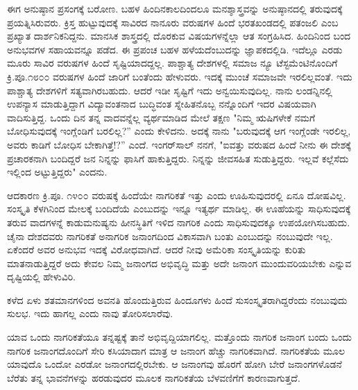 ಈಗ ಅನುಷ್ಠಾನ ಪ್ರಸಂಗಕ್ಕೆ ಬರೋಣ. ಬಹಳ ಹಿಂದಿನಕಾಲದಿಂದಲೂ ಮನಶ್ಶಾಸ್ತ್ರವನ್ನು ಅನುಷ್ಠಾನದಲ್ಲಿ ತರುವುದಕ್ಕೆ ಪ್ರಯತ್ನಿಸಿರುವರು. ಕ್ರಿಸ್ತ ಹುಟ್ಟುವುದಕ್ಕೆ ಸಾವಿರದ ನಾನೂರು ವರುಷಗಳ ಹಿಂದೆ ಭರತಖಂಡದಲ್ಲಿ ಪತಂಜಲಿ ಎಂಬ ಪ್ರಖ್ಯಾತ ದಾರ್ಶನಿಕನಿದ್ದನು. ಮಾನಸಿಕ ಶಾಸ್ತ್ರದಲ್ಲಿ ದೊರಕುವ ವಿಷಯಗಳನ್ನೆಲ್ಲಾ ಆತ ಸಂಗ್ರಹಿಸಿದ. ಹಿಂದಿನಿಂದ ಬಂದ ಅನುಭವಗಳ ಸಹಾಯವನ್ನೂ ಪಡೆದ. ಈ ಪ್ರಪಂಚ ಬಹಳ ಹಳೆಯದೆಂಬುದನ್ನು ಜ್ಞಾಪಕದಲ್ಲಿಡಿ. ಇದೆಲ್ಲೂ ಎರಡು ಮೂರು ಸಾವಿರ ವರುಷಗಳ ಹಿಂದೆ ಸೃಷ್ಟಿಯಾದದ್ದಲ್ಲ. ಪಾಶ್ಚಾತ್ಯ ದೇಶಗಳಲ್ಲಿ ಸಮಾಜ ನ್ಯೂ ಟೆಸ್ಟಮೆಂಟಿನೊಂದಿಗೆ ಕ್ರಿ.ಪೂ.೧೮೦೦ ವರುಷಗಳ ಹಿಂದೆ ಜಾರಿಗೆ ಬಂತೆಂದು ಹೇಳುವರು. ಇದಕ್ಕೆ ಮುಂಚೆ ಸಮಾಜವೇ ಇರಲಿಲ್ಲವಂತೆ. ಇದು ಪಾಶ್ಚಾತ್ಯ ದೇಶಗಳಿಗೆ ಸತ್ಯವಾಗಿರಬಹುದು. ಆದರೆ ಇಡೀ ಸೃಷ್ಟಿಗೆ ಇದು ಅನ್ವಯಿಸುವುದಿಲ್ಲ. ನಾನು ಲಂಡನ್ನಿನಲ್ಲಿ ಉಪನ್ಯಾಸ ಮಾಡುತ್ತಿದ್ದಾಗ ವಿದ್ಯಾವಂತನಾದ ಬುದ್ಧಿವಂತ ಸ್ನೇಹಿತನೊಬ್ಬ ನನ್ನೊಂದಿಗೆ ಇದರ ವಿಷಯವಾಗಿ ವಾದಿಸುತ್ತಿದ್ದ. ಒಂದು ದಿನ ತನ್ನ ವಾದವನ್ನೆಲ್ಲ ವ್ಯರ್ಥಮಾಡಿದ ಮೇಲೆ ತಕ್ಷಣ "ನಿಮ್ಮ ಋಷಿಗಳೇಕೆ ನಮಗೆ ಬೋಧಿಸುವುದಕ್ಕೆ ಇಂಗ್ಲೆಂಡಿಗೆ ಬರಲಿಲ್ಲ?” ಎಂದು ಕೇಳಿದನು. ಅದಕ್ಕೆ ನಾನು "ಬರುವುದಕ್ಕೆ ಆಗ ಇಂಗ್ಲೆಂಡೇ ಇರಲಿಲ್ಲ, ಅವರು ಕಾಡಿಗೆ ಬೋಧಿಸ ಬೇಕಾಗಿತ್ತೆ!?” ಎಂದೆ. ಇಂಗರ್‌ಸಾಲ್ ನನಗೆ, "ಐವತ್ತು ವರುಷದ ಹಿಂದೆ ನೀನು ಈ ದೇಶಕ್ಕೆ ಪ್ರಚಾರಕನಾಗಿ ಬಂದಿದ್ದರೆ ಜನ ನಿನ್ನನ್ನು ಫಾಸಿಗೆ ಹಾಕುತ್ತಿದ್ದರು. ನಿನ್ನನ್ನು ಜೀವಸಹಿತ ಸುಡುತ್ತಿದ್ದರು. ಇಲ್ಲವೆ ಕಲ್ಲೆಸೆದು ಇಲ್ಲಿಂದ ಅಟ್ಟುತ್ತಿದ್ದರು" ಎಂದನು.

ಆದಕಾರಣ ಕ್ರಿ.ಪೂ. ೧೪೦೦ ವರುಷಕ್ಕೆ ಹಿಂದೆಯೇ ನಾಗರಿಕತೆ ಇತ್ತು ಎಂದು ಊಹಿಸುವುದರಲ್ಲಿ ಏನೂ ದೋಷವಿಲ್ಲ. ಸಂಸ್ಕೃತಿ ಕೆಳಗಿನಿಂದ ಮೇಲಕ್ಕೆ ಬಂದಿದೆಯೆ ಎಂಬುದನ್ನು ಇನ್ನೂ ಇತ್ಯರ್ಥ ಮಾಡಿಲ್ಲ. ಈ ಊಹೆಯನ್ನು ಸಾಧಿಸುವುದಕ್ಕೆ ತರುವ ವಾದಗಳನ್ನೆ ಕಾಡುಮನುಷ್ಯನು ಹೀನಸ್ಥಿತಿಗೆ ಇಳಿದ ನಾಗರಿಕ ಎಂದು ಸಾಧಿಸುವುದಕ್ಕೂ ಉಪಯೋಗಿಸಬಹುದು. ಚೈನಾ ದೇಶದವರು ನಾಗರಿಕತೆ ಅನಾಗರಿಕ ಜನಾಂಗದಿಂದ ವಿಕಾಸವಾಗಿ ಬಂತು ಎಂಬುದನ್ನು ನಂಬುವುದೇ ಇಲ್ಲ. ಏಕೆಂದರೆ ಅವರ ಅನುಭವ ಇದಕ್ಕೆ ವಿರೋಧವಾಗಿದೆ. ಆದರೆ ನೀವು ಅಮೆರಿಕಾ ಸಂಸ್ಕೃತಿಯನ್ನು ಕುರಿತು ಮಾತನಾಡುತ್ತಿದ್ದರೆ ಅದು ಕೇವಲ ನಿಮ್ಮ ಜನಾಂಗದ ಅಭಿವೃದ್ಧಿ ಮತ್ತು ಅದೇ ಜನಾಂಗ ಮುಂದುವರಿಯಬೇಕು ಎನ್ನುವ ದೃಷ್ಟಿಯಲ್ಲಿ ಹೇಳುವಿರಿ.

ಕಳೆದ ಏಳು ಶತಮಾನಗಳಿಂದ ಅವನತಿ ಹೊಂದುತ್ತಿರುವ ಹಿಂದೂಗಳು ಹಿಂದೆ ಸುಸಂಸ್ಕೃತರಾಗಿದ್ದರೆಂದು ನಂಬುವುದು ಸುಲಭ. ಇದು ಹಾಗಲ್ಲ ಎಂದು ನಾವು ತೋರಿಸಲಾರೆವು.

ಯಾವ ಒಂದು ನಾಗರಿಕತೆಯೂ ತನ್ನಷ್ಟಕ್ಕೆ ತಾನೆ ಅಭಿವೃದ್ದಿಯಾಗಲಿಲ್ಲ. ಮತ್ತೊಂದು ನಾಗರಿಕ ಜನಾಂಗ ಬಂದು ಒಂದು ನಾಗರಿಕ ಜನಾಂಗದೊಂದಿಗೆ ಸೇರಿ ಕಸಿಯಾದಾಗ ಮಾತ್ರ ಆ ಜನಾಂಗ ಹೆಚ್ಚು ನಾಗರಿಕವಾಗಿದೆ. ನಾಗರಿಕತೆಯ ಮೂಲ ಯಾವುದೊ ಒಂದೋ ಎರಡೋ ಜನಾಂಗದಲ್ಲಿರಬೇಕು. ಆ ಜನಾಂಗವು ಹೊರಗೆ ಹೋಗಿ ಬೇರೆ ಜನಾಂಗಗಳೊಡನೆ ಬೆರೆತು ತನ್ನ ಭಾವನೆಗಳನ್ನು ಹರಡುವುದರ ಮೂಲಕ ನಾಗರಿಕತೆಯ ಬೆಳವಣಿಗೆಗೆ ಕಾರಣವಾಗುತ್ತದೆ.

